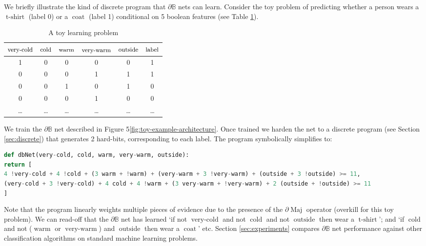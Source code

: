 \documentclass{article}
\theoremstyle{plain}
\theoremstyle{definition}
\theoremstyle{remark}
\begin{document}
We briefly illustrate the kind of discrete program that $\partial\mathbb{B}$ nets can learn. Consider the toy problem of predicting whether a person wears a $\operatorname{t-shirt}$ (label 0) or a $\operatorname{coat}$ (label 1) conditional on 5 boolean features (see Table \ref{tab:toy2}).

\begin{table}[h!]
	\centering
	\begin{tabular}{|c|c|c|c|c|c|}
		$\text{\small very-cold}$ & $\text{\small cold}$ & $\text{\small warm}$ & $\text{\small very-warm}$ & $\text{\small outside}$ & $\text{\small label}$ \\ \hline
		1 & 0 & 0 & 0 & 0 & 1 \\
		0 & 0 & 0 & 1 & 1 & 1 \\
		0 & 0 & 1 & 0 & 1 & 0 \\
		0 & 0 & 0 & 1 & 0 & 0 \\
		\dots & \dots & \dots & \dots & \dots & \dots
	\end{tabular}
	\caption{A toy learning problem}
	\label{tab:toy2}
\end{table}

We train the $\partial\mathbb{B}$ net described in Figure 5\ref{fig:toy-example-architecture}. Once trained we harden the net to a discrete program (see Section \ref{sec:discrete}) that generates 2 hard-bits, corresponding to each label. The program symbolically simplifies to:

\begin{lstlisting}[language=Python,style=mystyle,frame=single]
def dbNet(very-cold, cold, warm, very-warm, outside):
return [
4 !very-cold + 4 !cold + (3 warm + !warm) + (very-warm + 3 !very-warm) + (outside + 3 !outside) >= 11,
(very-cold + 3 !very-cold) + 4 cold + 4 !warm + (3 very-warm + !very-warm) + 2 (outside + !outside) >= 11
]
\end{lstlisting}

Note that the program linearly weights multiple pieces of evidence due to the presence of the $\partial\!\operatorname{Maj}$ operator (overkill for this toy problem). We can read-off that the $\partial\mathbb{B}$ net has learned `if not $\operatorname{very-cold}$ and not $\operatorname{cold}$ and not $\operatorname{outside}$ then wear a $\operatorname{t-shirt}$'; and `if $\operatorname{cold}$ and not ($\operatorname{warm}$ or $\operatorname{very-warm}$) and $\operatorname{outside}$ then wear a $\operatorname{coat}$' etc. Section \ref{sec:experiments} compares $\partial\mathbb{B}$ net performance against other classification algorithms on standard machine learning problems.
\end{document}
